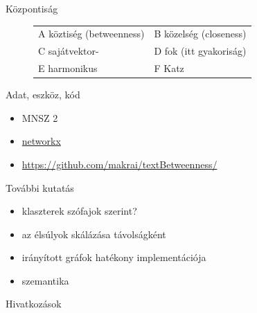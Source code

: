 \documentclass{beamer}
\newlength{\onecolwid}
\begin{document}
\begin{frame}[t]
\begin{columns}[t]
\begin{column}{\onecolwid}
\begin{block}{Központiság}
\begin{figure}
              \begin{tabular}{ll}
                \alert{A} köztiség (betweenness)	& \alert{B} közelség (closeness) \\
                \alert{C} sajátvektor-	& \alert{D} fok (itt gyakoriság)\\
                \alert{E} harmonikus	& \alert{F} Katz \\
              \end{tabular}
          \end{figure}
        \end{block}

        \bigskip

        \begin{block}{Adat, eszköz, kód}
          \begin{itemize}
            \item MNSZ 2 \citep{oravecz2014hungarian}
            \item \href{https://networkx.github.io/}{networkx}
              \citep{hagberg08exploring}
            \item \url{https://github.com/makrai/textBetweenness/}
          \end{itemize}
        \end{block}

        \bigskip

        \begin{block}{További kutatás}
          \begin{itemize}
            \item klaszterek szófajok szerint?
            \item az élsúlyok skálázása távolságként
            \item irányított gráfok hatékony implementációja
            \item szemantika
          \end{itemize}
        \end{block}

        \bigskip

        \begin{block}{Hivatkozások}
          \small
            
            
        \end{block}

      \end{column} 
  \end{columns}
\end{frame}
\end{document}
